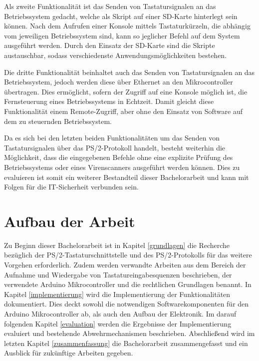 Als zweite Funktionalität ist das Senden von Tastatursignalen an das Betriebssystem gedacht, welche als Skript auf einer SD-Karte hinterlegt sein können. Nach dem Aufrufen einer Konsole mittels Tastaturkürzeln, die abhängig vom jeweiligen Betriebssystem sind, kann so jeglicher Befehl auf dem System ausgeführt werden. Durch den Einsatz der SD-Karte sind die Skripte austauschbar, sodass verschiedenste Anwendungsmöglichkeiten bestehen.

Die dritte Funktionalität beinhaltet auch das Senden von Tastatursignalen an das Betriebssystem, jedoch werden diese über Ethernet an den Mikrocontroller übertragen. Dies ermöglicht, sofern der Zugriff auf eine Konsole möglich ist, die Fernsteuerung eines Betriebssystems in Echtzeit. Damit gleicht diese Funktionalität einem Remote-Zugriff, aber ohne den Einsatz von Software auf dem zu steuernden Betriebssystem.

Da es sich bei den letzten beiden Funktionalitäten um das Senden von Tastatursignalen über das PS/2-Protokoll handelt, besteht weiterhin die Möglichkeit, dass die eingegebenen Befehle ohne eine explizite Prüfung des Betriebssystems oder eines Virenscanners ausgeführt werden können. Dies zu evaluieren ist somit ein weiterer Bestandteil dieser Bachelorarbeit und kann mit Folgen für die IT-Sicherheit verbunden sein.



\section{Aufbau der Arbeit}
Zu Beginn dieser Bachelorarbeit ist in Kapitel \ref{grundlagen} die Recherche bezüglich der PS/2-Tastaturschnittstelle und des PS/2-Protokolls für das weitere Vorgehen erforderlich. Zudem werden verwandte Arbeiten aus dem Bereich der Aufnahme und Wiedergabe von Tastatureingabesquenzen beschrieben, der verwendete Arduino Mikrocontroller und die rechtlichen Grundlagen benannt. In Kapitel \ref{implementierung} wird die Implementierung der Funktionalitäten dokumentiert. Dies deckt sowohl die notwendigen Softwarekomponenten für den Arduino Mikrocontroller ab, als auch den Aufbau der Elektronik. Im darauf folgenden Kapitel \ref{evaluation} werden die Ergebnisse der Implementierung evaluiert und bestehende Abwehrmechanismen beschrieben. Abschließend wird im letzten Kapitel \ref{zusammenfassung} die Bachelorarbeit zusammengefasst und ein Ausblick für zukünftige Arbeiten gegeben.